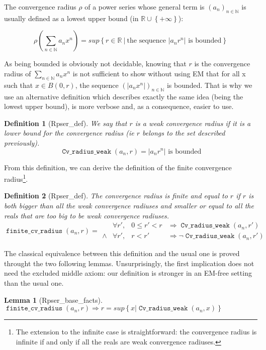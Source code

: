 \documentclass[submission,copyright]{eptcs}
\newcommand{\N}{\mathbb{N}}
\newcommand{\R}{\mathbb{R}}
\DeclareMathOperator{\cvrw}{\mathtt{Cv\_radius\_weak}}
\DeclareMathOperator{\fcvr}{\mathtt{finite\_cv\_radius}}
\newtheorem{definition}{Definition}
\newtheorem{lemma}{Lemma}
\begin{document}
The convergence radius $\rho$ of a power series whose general term is
$(a_n)_{n \in \N}$ is usually defined as a lowest upper bound (in
$\R \cup \left\lbrace +\infty \right\rbrace$):

 $$\rho(\sum_{n \in \N} a_n x^n) = sup \left\lbrace r \in \R ~|~
   \text{the sequence } \left|a_n r^n\right| \text{ is bounded}
   \right\rbrace$$

As being bounded is obviously not decidable, knowing that $r$ is the
convergence radius of $\sum_{n \in \N} a_n x^n$ is not sufficient to
show without using EM that for all x such that $x \in B(0,r)$, the
sequence $(\left| a_n x^n \right|)_{n \in \N}$ is bounded. That is why
we use an alternative definition which describes exactly the same
idea (being the lowest upper bound), is more verbose and, as a
consequence, easier to use.

\begin{definition}[Rpser\_def] We say that $r$ is a weak convergence
radius if it is a lower bound for the convergence radius (ie $r$ belongs
to the set described previously).
$$\cvrw{}(a_n,r) = \left| a_n r^n \right| \text{ is bounded}$$
\end{definition}

From this definition, we can derive the definition of the finite
convergence radius\footnote{The extension to the infinite case is
straightforward: the convergence radius is infinite if and only if
all the reals are weak convergence radiuses.}.

\begin{definition}[Rpser\_def] The convergence radius is finite and
equal to $r$ if $r$ is both bigger than all the weak convergence radiuses 
and smaller or equal to all the reals that are too big to be weak
convergence radiuses.
$$\fcvr{}(a_n,r) =
\begin{array}{clcl}
        & \forall r', & 0 \le r' < r & \Rightarrow \cvrw{}(a_n,r') \\
 \wedge & \forall r', & r < r' & \Rightarrow \neg \cvrw{}(a_n,r')
\end{array}$$
\end{definition}

The classical equivalence between this definition and the usual one is proved
throught the two following lemmas. Unsurprisingly, the first implication does
not need the excluded middle axiom: our definition is stronger in an EM-free
setting than the usual one.

\begin{lemma}[Rpser\_base\_facts] $\fcvr{}(a_n,r) \Rightarrow r = sup \left\lbrace x |
\cvrw{}(a_n, x) \right\rbrace$ \end{lemma}
\end{document}
